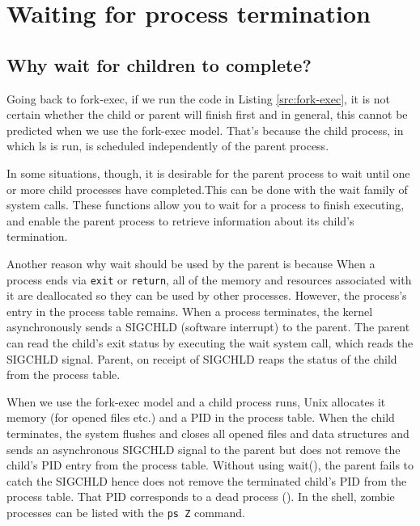 \documentclass[a4paper]{article}
\begin{document}
\section{Waiting for process termination}


\subsection{Why wait for children to complete?}

Going back to fork-exec, if we run the code in Listing \ref{src:fork-exec}, it is not certain whether the child or parent will finish first and in general, this cannot be predicted when we use the fork-exec model. That’s because the child process, in which ls is run, is scheduled independently of the parent process.

In some situations, though, it is desirable for the parent process to wait until one or
more child processes have completed.This can be done with the wait family of system
calls. These functions allow you to wait for a process to finish executing, and enable
the parent process to retrieve information about its child’s termination.

Another reason why wait should be used by the parent is because When a process ends via \texttt{exit} or \texttt{return}, all of the memory and resources associated with it are deallocated so they can be used by other processes. However, the process's entry in the process table remains. When a process terminates, the kernel asynchronously sends a SIGCHLD  (software interrupt) to the parent. The parent can read the child's exit status by executing the wait system call, which reads the SIGCHLD signal. Parent, on receipt of SIGCHLD reaps the status of the child from the process table.

When we use the fork-exec model and a child process runs, Unix allocates it memory (for opened files etc.) and a PID in the process table. When the child terminates, the system flushes and closes all opened files and data structures and sends an asynchronous SIGCHLD signal to the parent but does not remove the child's PID entry from the process table. Without using wait(), the parent fails to catch the SIGCHLD hence does not remove the terminated child's PID from the process table. That PID corresponds to a dead process (). In the shell, zombie processes can be listed with the \texttt{ps Z} command.
\end{document}
